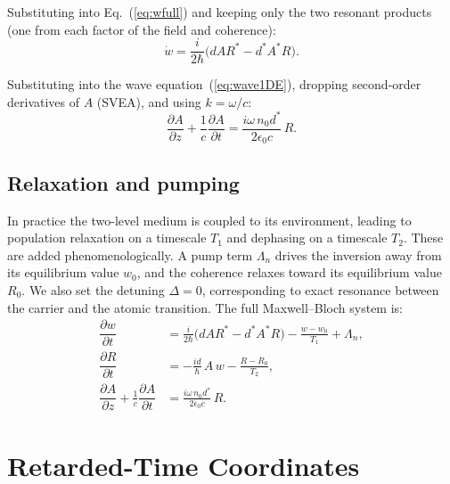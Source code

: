 \documentclass[12pt,a4paper]{article}
\newcommand{\pderiv}[2]{\dfrac{\partial #1}{\partial #2}}
\begin{document}
Substituting into Eq.~(\ref{eq:wfull}) and keeping only the two resonant
products (one from each factor of the field and coherence):
\begin{equation}
  \dot{w} = \frac{i}{2\hbar}\bigl(dAR^* - d^*A^*R\bigr).
\end{equation}

Substituting into the wave equation~(\ref{eq:wave1DE}), dropping second-order
derivatives of $A$ (SVEA), and using $k = \omega/c$:
\begin{equation}
  \pderiv{A}{z} + \frac{1}{c}\pderiv{A}{t}
  = \frac{i\omega\,n_0 d^*}{2\epsilon_0 c}\,R.
\end{equation}

\subsection{Relaxation and pumping}

In practice the two-level medium is coupled to its environment, leading to
population relaxation on a timescale $T_1$ and dephasing on a timescale $T_2$.
These are added phenomenologically. A pump term $\Lambda_n$ drives the
inversion away from its equilibrium value $w_0$, and the coherence relaxes
toward its equilibrium value $R_0$. We also set the detuning $\Delta = 0$,
corresponding to exact resonance between the carrier and the atomic transition.
The full Maxwell--Bloch system is:
\begin{align}
  \pderiv{w}{t}
    &= \frac{i}{2\hbar}\bigl(dAR^* - d^*A^*R\bigr)
       - \frac{w - w_0}{T_1}
       + \Lambda_n,
  \label{eq:invSVEA}\\[4pt]
  \pderiv{R}{t}
    &= - \frac{id}{\hbar}\,A\,w - \frac{R - R_0}{T_2},
  \label{eq:cohSVEA}\\[4pt]
  \pderiv{A}{z} + \frac{1}{c}\pderiv{A}{t}
    &= \frac{i\omega\,n_0 d^*}{2\epsilon_0 c}\,R.
  \label{eq:fieldSVEA}
\end{align}

\section{Retarded-Time Coordinates}
\end{document}

